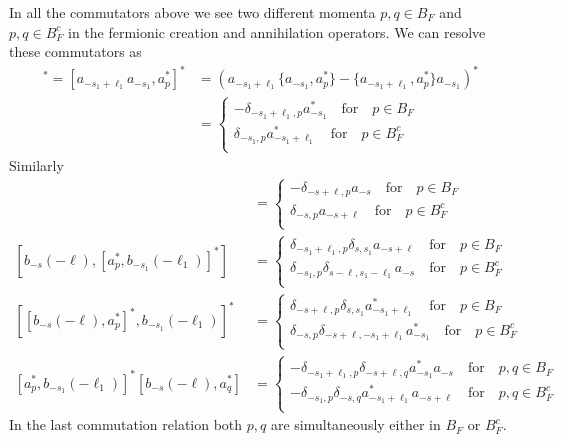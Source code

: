 \documentclass[sn-mathphys, Numbered ,a4paper]{sn-jnl}%
\theoremstyle{plain}
\theoremstyle{definition}
\theoremstyle{remark}
\theoremstyle{plain}
\theoremstyle{definition}
\theoremstyle{remark}
\begin{document}
In all the commutators above we see two different momenta $p,q \in B_F$ and $p,q \in B^c_F$ in the fermionic creation and annihilation operators. We can resolve these commutators as 
\begin{align}
 [b_{-s_1}(-\ell_1), a^*_{p}]^* = [a_{-s_1+\ell_1}a_{-s_1}, a^*_{p}]^* &=\left(a_{-s_1+\ell_1}\{a_{-s_1}, a^*_{p}\}-\{a_{-s_1+\ell_1}, a^*_{p}\}a_{-s_1} \right)^*\\ 
    &=\begin{cases}
        -\delta_{-s_1+\ell_1,p}a^*_{-s_1} \quad\text{for}\quad p \in B_F\\
         \delta_{-s_1,p}a^*_{-s_1+\ell_1} \quad\text{for}\quad p \in B^c_F\\
    \end{cases}
\end{align}
Similarly
\begin{align}
    [b_{-s}(-\ell), a^*_{p}] &= 
    \begin{cases}
        -\delta_{-s+\ell,p}a_{-s} \quad\text{for}\quad p \in B_F\\
         \delta_{-s,p}a_{-s+\ell} \quad\text{for}\quad p \in B^c_F\\
    \end{cases}\\
    \left[b_{-s}(-\ell), [a^*_{p},b_{-s_1}(-\ell_1)]^*\right]&=\begin{cases}
        \delta_{-s_1+\ell_1,p}\delta_{s,s_1}a_{-s+\ell} \quad\text{for}\quad p \in B_F\\
        \delta_{-s_1,p}\delta_{s-\ell,s_1-\ell_1}a_{-s} \quad\text{for}\quad p \in B^c_F\\
    \end{cases}\\
    \left[ [b_{-s}(-\ell), a^*_{p}]^*, b_{-s_1}(-\ell_1) \right]^* &=\begin{cases}
        \delta_{-s+\ell,p}\delta_{s,s_1}a^*_{-s_1+\ell_1} \quad\text{for}\quad p \in B_F\\
        \delta_{-s,p}\delta_{-s+\ell,-s_1+\ell_1}a^*_{-s_1} \quad\text{for}\quad p \in B^c_F\\
    \end{cases}\\
    [a^*_{p},b_{-s_1}(-\ell_1)]^*[b_{-s}(-\ell), a^*_{q}] &= \begin{cases}
        -\delta_{-s_1+\ell_1,p}\delta_{-s+\ell,q}a^*_{-s_1}a_{-s} \quad\text{for}\quad p,q \in B_F\\
         -\delta_{-s_1,p}\delta_{-s,q}a^*_{-s_1+\ell_1}a_{-s+\ell} \quad\text{for}\quad p,q \in B^c_F\\
    \end{cases}
\end{align}
In the last commutation relation both $p,q$ are simultaneously either in $B_F$ or $B_F^c$.
\end{document}

